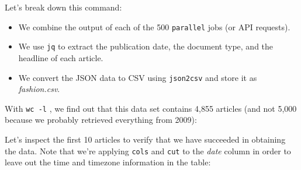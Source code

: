 \documentclass[
]{book}
\newenvironment{Shaded}{\begin{snugshade}}{\end{snugshade}}
\newcommand{\ExtensionTok}[1]{#1}
\newcommand{\FunctionTok}[1]{\textcolor[rgb]{0.00,0.00,0.00}{#1}}
\newcommand{\NormalTok}[1]{#1}
\providecommand{\tightlist}{%
  \setlength{\itemsep}{0pt}\setlength{\parskip}{0pt}}
\theoremstyle{definition}
\theoremstyle{definition}
\theoremstyle{definition}
\theoremstyle{remark}
\begin{document}
Let's break down this command:

\begin{itemize}
\tightlist
\item
  We combine the output of each of the 500 \texttt{parallel} jobs (or API requests).
\item
  We use \texttt{jq} to extract the publication date, the document type, and the headline of each article.
\item
  We convert the JSON data to CSV using \texttt{json2csv} and store it as \emph{fashion.csv}.
\end{itemize}

With \texttt{wc\ -l} \citep{wc}, we find out that this data set contains 4,855 articles (and not 5,000 because we probably retrieved everything from 2009):

\begin{Shaded}
\end{Shaded}

Let's inspect the first 10 articles to verify that we have succeeded in obtaining the data. Note that we're applying \texttt{cols} \citep{cols} and \texttt{cut} \citep{cut} to the \emph{date} column in order to leave out the time and timezone information in the table:
\end{document}
